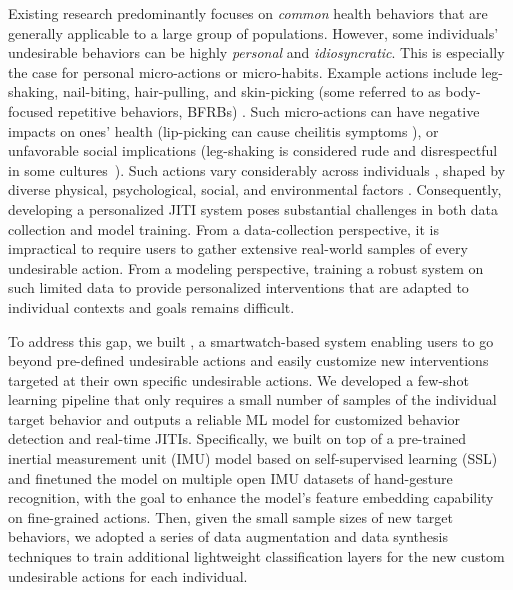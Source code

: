 Existing research predominantly focuses on \textit{common} health behaviors that are generally applicable to a large group of populations. However, some individuals' undesirable behaviors can be highly \textit{personal} and \textit{idiosyncratic}. This is especially the case for personal micro-actions or micro-habits.
Example actions include leg-shaking, nail-biting, hair-pulling, and skin-picking (some referred to as body-focused repetitive behaviors, BFRBs) \cite{stein1998phenomenology, snorrason2012skin,teng2002body,oshio2018shake,stein2008trichotillomania}. Such micro-actions can have negative impacts on ones' health (\eg lip-picking can cause cheilitis symptoms \cite{chalkoo2016exfoliative,greenberg2017diseases}), or unfavorable social implications (\eg leg-shaking is considered rude and disrespectful in some cultures~\cite{yilmaz2024leg}).
Such actions vary considerably across individuals \cite{xu2022enabling}, shaped by diverse physical, psychological, social, and environmental factors \cite{trapp2015individual}. Consequently, developing a personalized JITI system poses substantial challenges in both data collection and model training. From a data-collection perspective, it is impractical to require users to gather extensive real-world samples of every undesirable action. From a modeling perspective, training a robust system on such limited data to provide personalized interventions that are adapted to individual contexts and goals remains difficult.

To address this gap, we built \textbf{\projectname}, a smartwatch-based system enabling users to go beyond pre-defined undesirable actions and easily customize new interventions targeted at their own specific undesirable actions.
We developed a few-shot learning pipeline that only requires a small number of samples of the individual target behavior and outputs a reliable ML model for customized behavior detection and real-time JITIs.
Specifically, we built on top of a pre-trained inertial measurement unit (IMU) model based on self-supervised learning (SSL) \cite{yuan2024self} and finetuned the model on multiple open IMU datasets of hand-gesture recognition, with the goal to enhance the model's feature embedding capability on fine-grained actions.
Then, given the small sample sizes of new target behaviors, we adopted a series of data augmentation and data synthesis techniques to train additional lightweight classification layers for the new custom undesirable actions for each individual.

